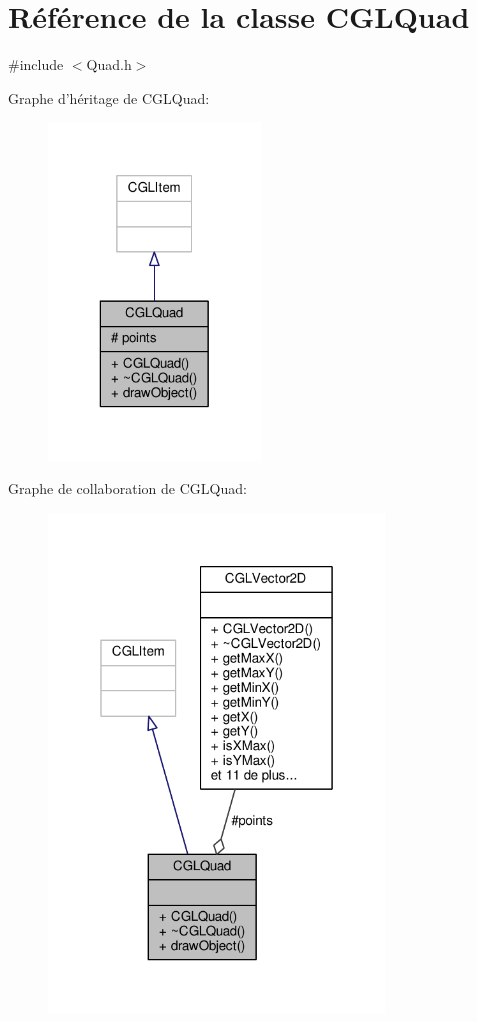 \hypertarget{class_c_g_l_quad}{\section{Référence de la classe C\-G\-L\-Quad}
\label{class_c_g_l_quad}
}


{\ttfamily \#include $<$Quad.\-h$>$}



Graphe d'héritage de C\-G\-L\-Quad\-:
\nopagebreak
\begin{figure}[H]
\begin{center}
\leavevmode
\includegraphics[width=160pt]{d8/de4/class_c_g_l_quad__inherit__graph}
\end{center}
\end{figure}


Graphe de collaboration de C\-G\-L\-Quad\-:
\nopagebreak
\begin{figure}[H]
\begin{center}
\leavevmode
\includegraphics[width=253pt]{dd/d46/class_c_g_l_quad__coll__graph}
\end{center}
\end{figure}
